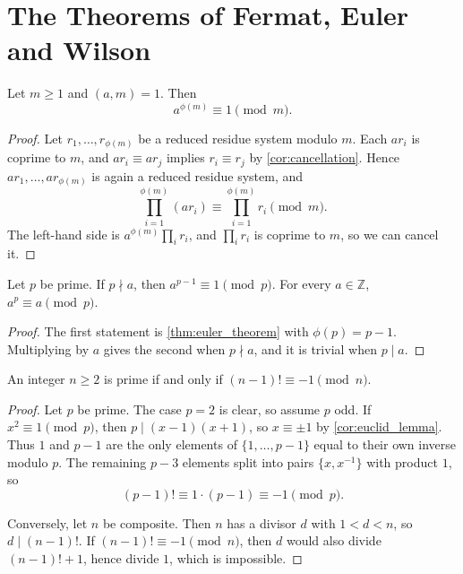 \section{The Theorems of Fermat, Euler and Wilson}

\begin{theorem}[Euler]\label{thm:euler_theorem}
    Let $m \ge 1$ and $(a,m) = 1$. Then
    \begin{equation*}
        a^{\phi(m)} \equiv 1 \pmod m.
    \end{equation*}
\end{theorem}
\begin{proof}
    Let $r_1, \dots, r_{\phi(m)}$ be a reduced residue system modulo $m$. Each $ar_i$ is coprime to $m$, and $ar_i \equiv ar_j$ implies $r_i \equiv r_j$ by \cref{cor:cancellation}. Hence $ar_1, \dots, ar_{\phi(m)}$ is again a reduced residue system, and
    \begin{equation*}
        \prod_{i=1}^{\phi(m)} (ar_i) \equiv \prod_{i=1}^{\phi(m)} r_i \pmod m.
    \end{equation*}
    The left-hand side is $a^{\phi(m)} \prod_i r_i$, and $\prod_i r_i$ is coprime to $m$, so we can cancel it.
\end{proof}

\begin{corollary}\label{cor:fermat}
    Let $p$ be prime. If $p \nmid a$, then $a^{p-1} \equiv 1 \pmod p$. For every $a \in \mathbb{Z}$, $a^p \equiv a \pmod p$.
\end{corollary}
\begin{proof}
    The first statement is \cref{thm:euler_theorem} with $\phi(p) = p - 1$. Multiplying by $a$ gives the second when $p \nmid a$, and it is trivial when $p \mid a$.
\end{proof}

\begin{theorem}[Wilson]\label{thm:wilson}
    An integer $n \ge 2$ is prime if and only if $(n-1)! \equiv -1 \pmod n$.
\end{theorem}
\begin{proof}
    Let $p$ be prime. The case $p = 2$ is clear, so assume $p$ odd. If $x^2 \equiv 1 \pmod p$, then $p \mid (x-1)(x+1)$, so $x \equiv \pm 1$ by \cref{cor:euclid_lemma}. Thus $1$ and $p - 1$ are the only elements of $\{1, \dots, p-1\}$ equal to their own inverse modulo $p$. The remaining $p - 3$ elements split into pairs $\{x, x^{-1}\}$ with product $1$, so
    \begin{equation*}
        (p-1)! \equiv 1 \cdot (p-1) \equiv -1 \pmod p.
    \end{equation*}

    Conversely, let $n$ be composite. Then $n$ has a divisor $d$ with $1 < d < n$, so $d \mid (n-1)!$. If $(n-1)! \equiv -1 \pmod n$, then $d$ would also divide $(n-1)! + 1$, hence divide $1$, which is impossible.
\end{proof}
